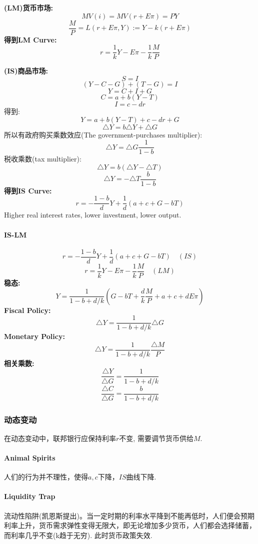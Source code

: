 \documentclass[UTF8, onecolumn, a4paper, 12pt]{article}
\begin{document}
\textbf{(LM)货币市场:}
$$MV(i) = MV(r+E\pi)=PY$$
$$\frac{M}{P} = L(r+E\pi, Y) := Y - k(r+E\pi)$$
\textbf{得到LM Curve:}
$$r = \frac{1}{k}Y - E\pi - \frac{1}{k}\frac{M}{P}$$

\textbf{(IS)商品市场:}
$$S = I$$
$$(Y-C-G) + (T-G) = I$$
$$Y = C+I+G$$
$$C = a+b(Y-T)$$
$$I = c-dr$$
得到:
$$Y = a+b(Y-T)+c-dr + G$$
$$\triangle Y = b\triangle Y + \triangle G$$
所以有政府购买乘数效应(The government-purchases multiplier):
$$\triangle Y = \triangle G\frac{1}{1-b}$$
税收乘数(tax multiplier):
$$\triangle Y = b(\triangle Y - \triangle T)$$
$$\triangle Y= -\triangle T\frac{b}{1-b}$$
\textbf{得到IS Curve:}
$$r = -\frac{1-b}{d}Y + \frac{1}{d}(a+c+G-bT)$$
Higher real interest rates, lower investment, lower output.
\paragraph{IS-LM}
$$r = -\frac{1-b}{d}Y + \frac{1}{d}(a+c+G-bT) \quad(IS)$$
$$r = \frac{1}{k}Y - E\pi - \frac{1}{k}\frac{M}{P} \quad(LM)$$
\textbf{稳态:}
$$Y = \frac{1}{1-b+d/k}(G - bT +\frac{d}{k}\frac{M}{P} +a +c + dE\pi)$$
\textbf{Fiscal Policy:}
$$\triangle Y = \frac{1}{1-b+d/k}\triangle G$$
\textbf{Monetary Policy:}
$$\triangle Y = \frac{1}{1-b+d/k}\frac{\triangle M}{P}$$
\textbf{相关乘数:}
$$\frac{\triangle Y}{\triangle G} = \frac{1}{1-b+d/k}$$
$$\frac{\triangle C}{\triangle G} = \frac{b}{1-b+d/k}$$
\subsubsection{动态变动}
在动态变动中，联邦银行应保持利率$r$不变, 需要调节货币供给$M$.
\paragraph{Animal Spirits} 人们的行为并不理性，使得$a, c$下降，$IS$曲线下降.
\paragraph{Liquidity Trap} 流动性陷阱(凯恩斯提出)。当一定时期的利率水平降到不能再低时，人们便会预期利率上升，货币需求弹性变得无限大，即无论增加多少货币，人们都会选择储蓄，而利率几乎不变(k趋于无穷). 此时货币政策失效.
\end{document}
